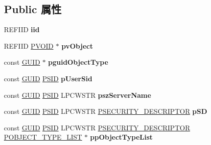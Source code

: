 \subsection*{Public 属性}
\begin{DoxyCompactItemize}
\item 
\mbox{\label{structiface_i_effective_permission_vbtl_a24b621f795b8a7841b22013449c838d4}} 
R\+E\+F\+I\+ID {\bfseries iid}
\item 
\mbox{\label{structiface_i_effective_permission_vbtl_a55487280e2e0b4d2b3b2f9c1c953733e}} 
R\+E\+F\+I\+ID \hyperlink{interfacevoid}{P\+V\+O\+ID} $\ast$ {\bfseries pv\+Object}
\item 
\mbox{\label{structiface_i_effective_permission_vbtl_ace5cea5f0e929d276e198092bfea4acc}} 
const \hyperlink{interface_g_u_i_d}{G\+U\+ID} $\ast$ {\bfseries pguid\+Object\+Type}
\item 
\mbox{\label{structiface_i_effective_permission_vbtl_a58a58314b58401e0976c9a61e43c3281}} 
const \hyperlink{interface_g_u_i_d}{G\+U\+ID} \hyperlink{struct___s_i_d}{P\+S\+ID} {\bfseries p\+User\+Sid}
\item 
\mbox{\label{structiface_i_effective_permission_vbtl_a686d6e71b4e996ea5b690d9982c77ab1}} 
const \hyperlink{interface_g_u_i_d}{G\+U\+ID} \hyperlink{struct___s_i_d}{P\+S\+ID} L\+P\+C\+W\+S\+TR {\bfseries psz\+Server\+Name}
\item 
\mbox{\label{structiface_i_effective_permission_vbtl_a9899d2e594dbfd82e925793274813688}} 
const \hyperlink{interface_g_u_i_d}{G\+U\+ID} \hyperlink{struct___s_i_d}{P\+S\+ID} L\+P\+C\+W\+S\+TR \hyperlink{struct___s_e_c_u_r_i_t_y___d_e_s_c_r_i_p_t_o_r}{P\+S\+E\+C\+U\+R\+I\+T\+Y\+\_\+\+D\+E\+S\+C\+R\+I\+P\+T\+OR} {\bfseries p\+SD}
\item 
\mbox{\label{structiface_i_effective_permission_vbtl_a8cd546a310153a1506922e1c7eecc2f2}} 
const \hyperlink{interface_g_u_i_d}{G\+U\+ID} \hyperlink{struct___s_i_d}{P\+S\+ID} L\+P\+C\+W\+S\+TR \hyperlink{struct___s_e_c_u_r_i_t_y___d_e_s_c_r_i_p_t_o_r}{P\+S\+E\+C\+U\+R\+I\+T\+Y\+\_\+\+D\+E\+S\+C\+R\+I\+P\+T\+OR} \hyperlink{struct___o_b_j_e_c_t___t_y_p_e___l_i_s_t}{P\+O\+B\+J\+E\+C\+T\+\_\+\+T\+Y\+P\+E\+\_\+\+L\+I\+ST} $\ast$ {\bfseries pp\+Object\+Type\+List}

\end{DoxyCompactItemize}
